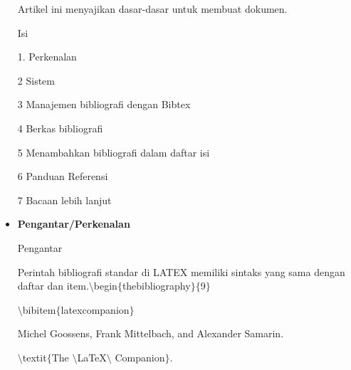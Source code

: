 \begin{itemize}
\noindent Artikel ini menyajikan dasar-dasar untuk membuat dokumen.\par


\noindent \hspace*{0.5in}Isi\par


\noindent \hspace*{0.5in}1. Perkenalan\par


\noindent \hspace*{0.5in}2 Sistem\par


\noindent \hspace*{0.5in}3 Manajemen bibliografi dengan Bibtex\par


\noindent \hspace*{0.5in}4 Berkas bibliografi\par


\noindent \hspace*{0.5in}5 Menambahkan bibliografi dalam daftar isi\par


\noindent \hspace*{0.5in}6 Panduan Referensi\par


\noindent \hspace*{0.5in}7 Bacaan lebih lanjut\par

\vspace{12pt}
	\item {\fontsize{14pt}{14pt}\selectfont \textbf{Pengantar/Perkenalan}}\par

Pengantar\par

Perintah bibliografi standar di LATEX memiliki sintaks yang sama dengan daftar dan item.$\setminus$begin$ \{ $thebibliography$ \} $$ \{ $9$ \} $\par

\hspace*{0.5in}$\setminus$bibitem$ \{ $latexcompanion$ \} $ \par

\hspace*{0.5in}Michel Goossens, Frank Mittelbach, and Alexander Samarin. \par

\hspace*{0.5in}$\setminus$textit$ \{ $The $\setminus$LaTeX$\setminus$ Companion$ \} $. \par


\end{itemize}
